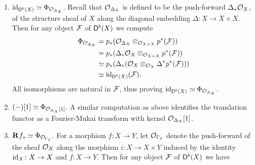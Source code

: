 \begin{example}
    \label{Identifying fm transforms}
\begin{enumerate}[label = (\roman*)]
    \item{
    $\operatorname{id}_{\mathsf{D}^b(X)} \simeq \Phi_{{\mathcal{O}_{\Delta_X}}}$. Recall that ${\mathcal{O}_{\Delta_X}}$ is defined to be the push-forward $\Delta_*{\mathcal{O}_{X}}$, of the structure sheaf of $X$ along the diagonal embedding $\Delta \colon X \to X \times X$. Then for any object $\mathcal F$ of $\mathsf{D}^b(X)$ we compute 
    \begin{align*}
        \Phi_{{\mathcal{O}_{\Delta_X}}} &= p_*({\mathcal{O}_{\Delta_X}} \otimes_{{\mathcal{O}_{X \times X}}} p^*(\mathcal F)) \\
        &= p_*(\Delta_*{\mathcal{O}_{X}} \otimes_{{\mathcal{O}_{X \times X}}} p^*(\mathcal F)) \\
        &\simeq p_*(\Delta_*({\mathcal{O}_{X}} \otimes_{{\mathcal{O}_{X}}} \Delta^*p^*(\mathcal F))) \\
        &\simeq \operatorname{id}_{\mathsf{D}^b(X)}(\mathcal F).
    \end{align*}
    All isomorphisms are natural in $\mathcal F$, thus proving $\operatorname{id}_{\mathsf{D}^b(X)} \simeq \Phi_{{\mathcal{O}_{\Delta_X}}}$.
    }
    \item{$(-)[1] \simeq \Phi_{{\mathcal{O}_{\Delta_X}}[1]}$. A similar computation as above identifies the translation functor as a Fourier-Mukai transform with kernel ${\mathcal{O}_{\Delta_X}}[1]$.}
    \item{$\mathbf{R}^{}f_* \simeq \Phi_{{\mathcal{O}_{\Gamma_f}}}$. For a morphism $f \colon X \to Y$, let ${\mathcal{O}_{\Gamma_f}}$ denote the push-forward of the sheaf ${\mathcal{O}_{X}}$ along the morphism $i\colon X \to X \times Y$ induced by the identity $\operatorname{id}_{X}\colon X \to X$ and $f\colon X \to Y$.  Then for any object $\mathcal F$ of $\mathsf{D}^b(X)$ we have
    \begin{align*}

\end{align*}}
\end{enumerate}
\end{example}
